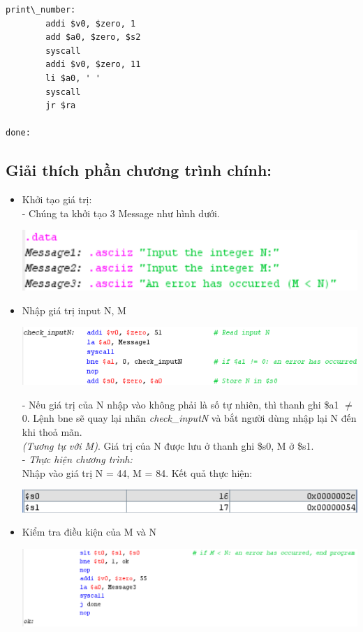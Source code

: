 \documentclass[12pt,a4paper,oneside]{article}
\begin{document}
\begin{center}
\begin{lstlisting}
print\_number:
		addi $v0, $zero, 1		
		add $a0, $zero, $s2
		syscall
		addi $v0, $zero, 11
		li $a0, ' '
		syscall
		jr $ra

done:

\end{lstlisting}
\end{center}
\subsection*{Giải thích phần chương trình chính:}
\begin{itemize}
	\item Khởi tạo giá trị: \\
	- Chúng ta khởi tạo 3 Message như hình dưới.
	\begin{center}
	\includegraphics[scale=1]{0}
	\end{center}
	\item Nhập giá trị input N, M
	\begin{center}
	\includegraphics[scale=1]{1}
	\end{center}
	- Nếu giá trị của N nhập vào không phải là số tự nhiên, thì thanh ghi \$a1 $\neq$ 0. Lệnh bne sẽ quay lại nhãn \textit{check\_inputN} và bắt người dùng nhập lại N đến khi thoả mãn. \\\textit{(Tương tự với M)}. Giá trị của N được lưu ở thanh ghi \$s0, M ở \$s1.
	\\- \textit{Thực hiện chương trình:}\\Nhập vào giá trị N = 44, M = 84. Kết quả thực hiện:
	\begin{center}
	\includegraphics[scale=1]{3}
	\end{center}
	\item Kiểm tra điều kiện của M và N
	\begin{center}
	\includegraphics[scale=0.9]{2}

\end{center}
\end{itemize}
\end{document}
